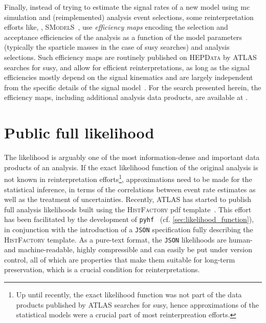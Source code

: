 Finally, instead of trying to estimate the signal rates of a new model using \gls{mc} simulation and (reimplemented) analysis event selections, some reinterpretation efforts like, \eg, \textsc{SModelS}~\cite{SModelS1:2013mwa,SModelS2:2017neo}, use \textit{efficiency maps} encoding the selection and acceptance efficiencies of the analysis as a function of the model parameters (typically the sparticle masses in the case of \gls{susy} searches) and analysis selections.
Such efficiency maps are routinely published on \textsc{HEPData} by ATLAS searches for \gls{susy}, and allow for efficient reinterpretations, as long as the signal efficiencies mostly depend on the signal kinematics and are largely independent from the specific details of the signal model~\cite{SModelS1:2013mwa}. For the \onelepton search presented herein, the efficiency maps, including additional analysis data products, are available at \cite{HEPdata_1Lbb}. 

\section{Public full likelihood}\label{sec:full_likelihood}

The likelihood is arguably one of the most information-dense and important data products of an analysis.
If the exact likelihood function of the original analysis is not known in reinterpretation efforts\footnote{Up until recently, the exact likelihood function was not part of the data products published by ATLAS searches for \gls{susy}, hence approximations of the statistical models were a crucial part of most reinterpreation efforts.}, approximations need to be made for the statistical inference, \eg in terms of the correlations between event rate estimates as well as the treatment of uncertainties.
Recently, ATLAS has started to publish full analysis likelihoods built using the \textsc{HistFactory} \gls{pdf} template~\cite{ATL-PHYS-PUB-2019-029}.
This effort has been facilitated by the development of \texttt{pyhf}~\cite{pyhf_joss,pyhf} (cf. \cref{sec:likelihood_function}), in conjunction with the introduction of a \texttt{JSON} specification fully describing the \textsc{HistFactory} template.
As a pure-text format, the \texttt{JSON} likelihoods are human- and machine-readable, highly compressible and can easily be put under version control, all of which are properties that make them suitable for long-term preservation, which is a crucial condition for reinterpretations.

